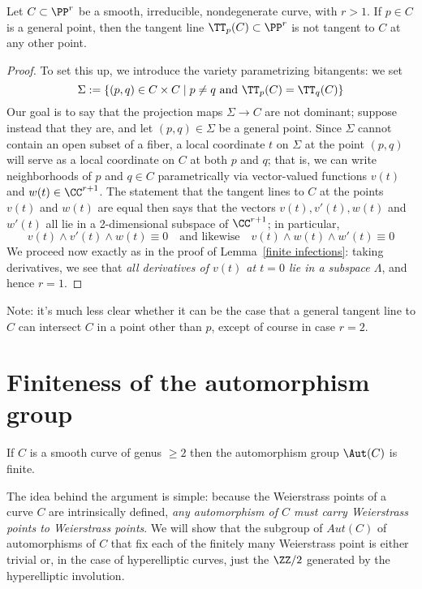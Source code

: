  \begin{lemma}\label{tangent not bitangent}
 Let $C \subset \PP^r$ be a smooth, irreducible, nondegenerate curve, with $r > 1$. If $p \in C$ is a general point, then the tangent line $\TT_p(C) \subset \PP^r$ is not tangent to $C$ at any other point.
 \end{lemma}
 
 \begin{proof}
 To set this up, we introduce the variety parametrizing bitangents: we set
 $$
 \Sigma := \{ (p,q) \in C \times C \mid p \neq q \text{ and }\TT_p(C) = \TT_q(C) \}
 $$
 Our goal is to say that the projection maps $\Sigma \to C$ are not dominant; suppose instead that they are, and let $(p,q) \in \Sigma$ be a general point. Since $\Sigma$ cannot contain an open subset of a fiber, a local coordinate $t$ on $\Sigma$ at the point $(p,q)$ will serve as a local coordinate on $C$ at both $p$ and $q$; that is, we can write neighborhoods of $p$ and $q \in C$ parametrically via vector-valued functions $v(t)$ and $w(t) \in \CC^{r+1}$. The statement that the tangent lines to $C$ at the points $v(t)$ and $w(t)$ are equal then says that the vectors $v(t), v'(t), w(t)$ and $w'(t)$ all lie in a 2-dimensional subspace of $\CC^{r+1}$; in particular,
 $$
 v(t) \wedge v'(t) \wedge w(t) \equiv 0 \quad \text{and likewise} \quad v(t) \wedge w(t) \wedge w'(t) \equiv 0
 $$
We proceed now exactly as in the proof of Lemma~\ref{finite infections}: taking derivatives, we see that \emph{all derivatives of $v(t)$ at $t=0$ lie in a subspace $\Lambda$}, and hence $r=1$.
 \end{proof}

Note: it's much less clear whether it can be the case that a general tangent line to $C$ can intersect $C$ in a point other than $p$, except of course in case $r=2$. %

\section{Finiteness of the automorphism group}\label{finiteness section}


\begin{theorem}\label{finite autos}
If $C$ is a smooth curve of genus $\geq 2$ then the automorphism group $\Aut(C)$ is finite.
\end{theorem}

  The idea behind the argument is simple: because the Weierstrass points of a curve $C$ are intrinsically defined, \emph{any automorphism of $C$ must carry Weierstrass points to Weierstrass points}. We will show that the subgroup of $Aut(C)$ of automorphisms of $C$ that fix each  of the finitely many Weierstrass point is either
  trivial or, in the case of hyperelliptic curves, just the $\ZZ/2$ generated by the hyperelliptic involution.
    

